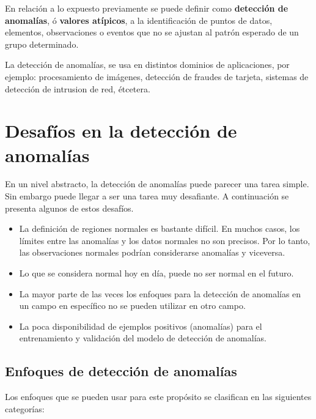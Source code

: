 En relaci\'{o}n a lo expuesto previamente se puede definir como \textbf{detecci\'{o}n de anomal\'{i}as}, \'{o} \textbf{valores at\'{i}picos}, a la identificación de puntos de datos, elementos, observaciones o eventos que no se ajustan al patrón esperado de un grupo determinado. 

\vspace{5mm} %

La detecci\'{o}n de anomal\'{i}as, se usa en distintos dominios de aplicaciones, por ejemplo: procesamiento de im\'{a}genes, detecci\'{o}n de fraudes de tarjeta, sistemas de detecci\'{o}n de intrusion de red, \'{e}tcetera.

\section{Desaf\'{i}os en la detecci\'{o}n de anomal\'{i}as}

En un nivel abstracto, la detecci\'{o}n de anomal\'{i}as puede parecer una tarea simple. Sin embargo puede llegar a ser una tarea muy desafiante. A continuaci\'{o}n se presenta algunos de estos desaf\'{i}os.

\begin{itemize}
\item La definici\'{o}n de regiones normales es bastante dif\'{i}cil. En muchos casos, los l\'{i}mites entre las anomal\'{i}as y los datos normales no son precisos. Por lo tanto, las observaciones normales podr\'{i}an considerarse anomal\'{i}as y viceversa.

\item Lo que se considera normal hoy en d\'{i}a, puede no ser normal en el futuro.

\item La mayor parte de las veces los enfoques para la detecci\'{o}n de anomal\'{i}as en un campo en espec\'{i}fico no se pueden utilizar en otro campo.

\item La poca disponibilidad de ejemplos positivos (anomal\'{i}as) para el entrenamiento y validaci\'{o}n del modelo de detecci\'{o}n de anomal\'{i}as.

\end{itemize}

\subsection{Enfoques de detecci\'{o}n de anomal\'{i}as}

Los enfoques que se pueden usar para este prop\'{o}sito se clasifican en las siguientes categor\'{i}as:

